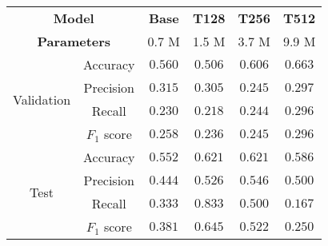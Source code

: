 \begin{tabular}{cc|cccc}
    \multicolumn{2}{c|}{\textbf{Model}} & \textbf{Base} & \textbf{T128} & \textbf{T256} & \textbf{T512} \\
    \multicolumn{2}{c|}{\textbf{Parameters}} & 0.7 M & 1.5 M & 3.7 M & 9.9 M \\\hline
    \multirow{4}{*}{Validation} & Accuracy    & $0.560$          & $0.506$          & $0.606$          & $\mathbf{0.663}$ \\
    & Precision   & $\mathbf{0.315}$ & $0.305$          & $0.245$          & $0.297$          \\
    & Recall      & $0.230$          & $0.218$          & $0.244$          & $\mathbf{0.296}$ \\
    & $F_1$ score & $0.258$          & $0.236$          & $0.245$          & $\mathbf{0.296}$ \\\hline
    \multirow{4}{*}{Test}       & Accuracy    & $0.552$          & $\mathbf{0.621}$ & $\mathbf{0.621}$ & $0.586$          \\
    & Precision   & $0.444$          & $0.526$          & $\mathbf{0.546}$ & $0.500$          \\
    & Recall      & $0.333$          & $\mathbf{0.833}$ & $0.500$          & $0.167$          \\
    & $F_1$ score & $0.381$          & $\mathbf{0.645}$ & $0.522$          & $0.250$          \\
\end{tabular}